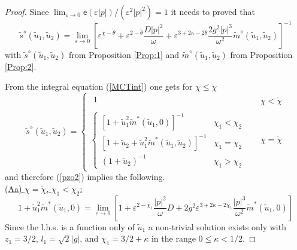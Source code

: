 \documentclass[12pt]{article}
\begin{document}
\begin{proof}
Since $\lim_{\varepsilon \to 0} \mathsf{e}(\varepsilon |p|)/(\varepsilon^2 |p|^2)=1$ 
it needs to proved that
\begin{equation}
\tilde{s}^{\diamond}(\tilde{u}_1,\tilde{u}_2)
= \lim_{\varepsilon \to 0}  \left[\varepsilon^{\chi -\mathring{\theta}}
+ 
\varepsilon^{2-\mathring{\theta}} \frac{D |p|^2}{\omega}  
+ \varepsilon^{3+2\kappa-2\mathring{\theta}} \frac{2 g^2  |p|^3}{\omega^2}
\tilde{m}^{\diamond}(\tilde{u}_1,\tilde{u}_2)
\right]^{-1}
\label{dMCTLFT4b}
\end{equation}
with $\tilde{s}^{\diamond}(\tilde{u}_1,\tilde{u}_2)$ from Proposition \ref{Prop:1} and $\tilde{m}^{\diamond}(\tilde{u}_1,\tilde{u}_2)$ from Proposition \ref{Prop:2}.

From the integral equation
(\ref{MCTint}) one gets for $\chi\leq\mathring{\chi}$
\begin{equation}
\tilde{s}^{\diamond}(\tilde{u}_1,\tilde{u}_2)
=  \left\{
\begin{array}{ll}
\begin{array}{ll}
1 &  \\
\end{array}  & \quad \chi < \mathring{\chi} \\[2mm]
\left\{
\begin{array}{ll}
\left[1+ \tilde{u}_1^2 \tilde{m}^{\ast}(\tilde{u}_1,0) \right]^{-1} & \chi_1 < \chi_2\\
\left[1+ \tilde{u}_2 + \tilde{u}_1^2 \tilde{m}^{\ast}(\tilde{u}_1,\tilde{u}_2) \right]^{-1} & \chi_1 = \chi_2 \\
\left(1+ \tilde{u}_2\right)^{-1} & \chi_1 > \chi_2
\end{array} \right. & \quad \chi = \mathring{\chi} 
\end{array} \right. 
\label{tsb2}
\end{equation}
and therefore (\ref{pzo2}) implies the following.\\
\underline{(Aa) $\chi = \mathring{\chi}$, $\chi_1 < \chi_2$:}
\begin{equation}
1+ \tilde{u}_1^2 \tilde{m}^{\ast}(\tilde{u}_1,0) 
= \lim_{\varepsilon \to 0}  \left[1
+ \varepsilon^{2-\chi_1} \frac{|p|^2}{\omega} D  
+ 2 g^2  \varepsilon^{3+2\kappa-2\chi_1} \frac{|p|^3}{\omega^2}
\tilde{m}^{\ast}(\tilde{u}_1,0)
\right]
\label{dMCTLFT4Aa}
\end{equation}
Since the l.h.s. is a function only of $\tilde{u}_1$ a non-trivial
solution exists only with $z_1=3/2$, $l_1 = \sqrt{2} |g|$, and
$\chi_1 = 3/2+\kappa$ in the range $0\leq \kappa < 1/2$. 

\end{proof}
\end{document}
